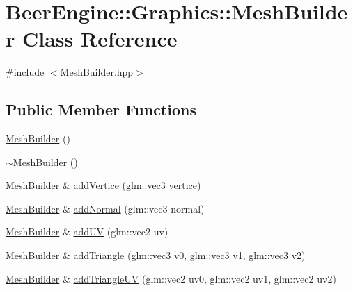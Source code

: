 \hypertarget{class_beer_engine_1_1_graphics_1_1_mesh_builder}{}\section{Beer\+Engine\+:\+:Graphics\+:\+:Mesh\+Builder Class Reference}
\label{class_beer_engine_1_1_graphics_1_1_mesh_builder}


{\ttfamily \#include $<$Mesh\+Builder.\+hpp$>$}

\subsection*{Public Member Functions}
\begin{DoxyCompactItemize}
\item 
\mbox{\hyperlink{class_beer_engine_1_1_graphics_1_1_mesh_builder_a37188d6e052302a6492e8c32499ebcac}{Mesh\+Builder}} ()
\item 
\mbox{\hyperlink{class_beer_engine_1_1_graphics_1_1_mesh_builder_aa83ee10b505b83585ef5a6d4d21ff65b}{$\sim$\+Mesh\+Builder}} ()
\item 
\mbox{\hyperlink{class_beer_engine_1_1_graphics_1_1_mesh_builder}{Mesh\+Builder}} \& \mbox{\hyperlink{class_beer_engine_1_1_graphics_1_1_mesh_builder_a9a6d36b00e8e62ab40a54f06545727ef}{add\+Vertice}} (glm\+::vec3 vertice)
\item 
\mbox{\hyperlink{class_beer_engine_1_1_graphics_1_1_mesh_builder}{Mesh\+Builder}} \& \mbox{\hyperlink{class_beer_engine_1_1_graphics_1_1_mesh_builder_a2b60b866d1d46a2011dd7ea406613337}{add\+Normal}} (glm\+::vec3 normal)
\item 
\mbox{\hyperlink{class_beer_engine_1_1_graphics_1_1_mesh_builder}{Mesh\+Builder}} \& \mbox{\hyperlink{class_beer_engine_1_1_graphics_1_1_mesh_builder_a7644037a2b65d5369063b353e0a1161f}{add\+UV}} (glm\+::vec2 uv)
\item 
\mbox{\hyperlink{class_beer_engine_1_1_graphics_1_1_mesh_builder}{Mesh\+Builder}} \& \mbox{\hyperlink{class_beer_engine_1_1_graphics_1_1_mesh_builder_ad652a03729f4938ce4d198edf4ab6abe}{add\+Triangle}} (glm\+::vec3 v0, glm\+::vec3 v1, glm\+::vec3 v2)
\item 
\mbox{\hyperlink{class_beer_engine_1_1_graphics_1_1_mesh_builder}{Mesh\+Builder}} \& \mbox{\hyperlink{class_beer_engine_1_1_graphics_1_1_mesh_builder_a99f5b7d008ee3a621835db8b2c5ef5c8}{add\+Triangle\+UV}} (glm\+::vec2 uv0, glm\+::vec2 uv1, glm\+::vec2 uv2)
\item 

\end{DoxyCompactItemize}
